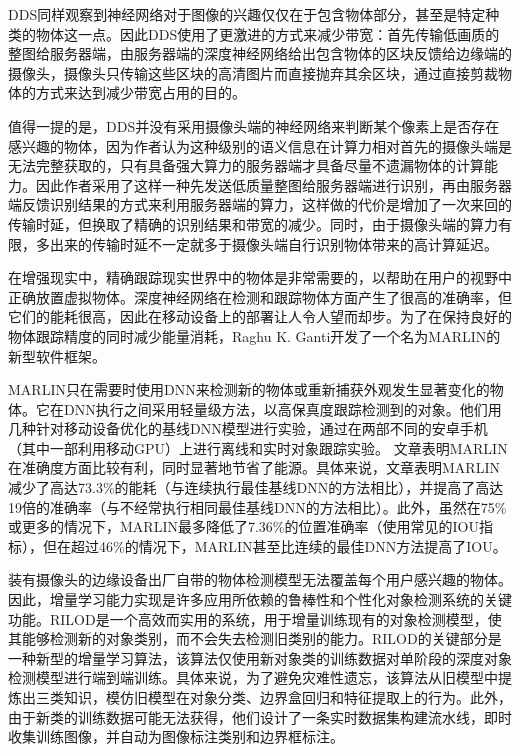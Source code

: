 DDS\cite{liu2019edge}同样观察到神经网络对于图像的兴趣仅仅在于包含物体部分，甚至是特定种类的物体这一点。因此DDS使用了更激进的方式来减少带宽：首先传输低画质的整图给服务器端，由服务器端的深度神经网络给出包含物体的区块反馈给边缘端的摄像头，摄像头只传输这些区块的高清图片而直接抛弃其余区块，通过直接剪裁物体的方式来达到减少带宽占用的目的。

值得一提的是，DDS并没有采用摄像头端的神经网络来判断某个像素上是否存在感兴趣的物体，因为作者认为这种级别的语义信息在计算力相对首先的摄像头端是无法完整获取的，只有具备强大算力的服务器端才具备尽量不遗漏物体的计算能力。因此作者采用了这样一种先发送低质量整图给服务器端进行识别，再由服务器端反馈识别结果的方式来利用服务器端的算力，这样做的代价是增加了一次来回的传输时延，但换取了精确的识别结果和带宽的减少。同时，由于摄像头端的算力有限，多出来的传输时延不一定就多于摄像头端自行识别物体带来的高计算延迟。

在增强现实中，精确跟踪现实世界中的物体是非常需要的，以帮助在用户的视野中正确放置虚拟物体。深度神经网络在检测和跟踪物体方面产生了很高的准确率，但它们的能耗很高，因此在移动设备上的部署让人令人望而却步。为了在保持良好的物体跟踪精度的同时减少能量消耗，Raghu K. Ganti开发了一个名为MARLIN\cite{ApiRanChe19}的新型软件框架。

MARLIN只在需要时使用DNN来检测新的物体或重新捕获外观发生显著变化的物体。它在DNN执行之间采用轻量级方法，以高保真度跟踪检测到的对象。他们用几种针对移动设备优化的基线DNN模型进行实验，通过在两部不同的安卓手机（其中一部利用移动GPU）上进行离线和实时对象跟踪实验。
文章表明MARLIN在准确度方面比较有利，同时显著地节省了能源。具体来说，文章表明MARLIN减少了高达73.3\%的能耗（与连续执行最佳基线DNN的方法相比），并提高了高达19倍的准确率（与不经常执行相同最佳基线DNN的方法相比）。此外，虽然在75\%或更多的情况下，MARLIN最多降低了7.36\%的位置准确率（使用常见的IOU指标），但在超过46\%的情况下，MARLIN甚至比连续的最佳DNN方法提高了IOU。

装有摄像头的边缘设备出厂自带的物体检测模型无法覆盖每个用户感兴趣的物体。因此，增量学习能力实现是许多应用所依赖的鲁棒性和个性化对象检测系统的关键功能。RILOD\cite{LiTasGho19}是一个高效而实用的系统，用于增量训练现有的对象检测模型，使其能够检测新的对象类别，而不会失去检测旧类别的能力。RILOD的关键部分是一种新型的增量学习算法，该算法仅使用新对象类的训练数据对单阶段的深度对象检测模型进行端到端训练。具体来说，为了避免灾难性遗忘，该算法从旧模型中提炼出三类知识，模仿旧模型在对象分类、边界盒回归和特征提取上的行为。此外，由于新类的训练数据可能无法获得，他们设计了一条实时数据集构建流水线，即时收集训练图像，并自动为图像标注类别和边界框标注。

